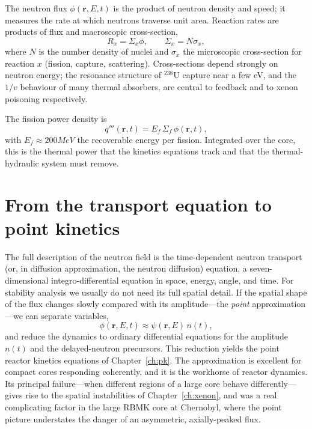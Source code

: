 The neutron flux $\phi(\mathbf r,E,t)$ is the product of neutron density and
speed; it measures the rate at which neutrons traverse unit area. Reaction rates
are products of flux and macroscopic cross-section,
\begin{equation}
R_x = \Sigma_x \phi, \qquad \Sigma_x = N\sigma_x,
\end{equation}
where $N$ is the number density of nuclei and $\sigma_x$ the microscopic
cross-section for reaction $x$ (fission, capture, scattering). Cross-sections
depend strongly on neutron energy; the resonance structure of $^{238}$U capture
near a few eV, and the $1/v$ behaviour of many thermal absorbers, are central to
feedback and to xenon poisoning respectively.

The fission power density is
\begin{equation}
q'''(\mathbf r,t) = E_f\, \Sigma_f\, \phi(\mathbf r,t),
\end{equation}
with $E_f\approx 200\unit{MeV}$ the recoverable energy per fission. Integrated
over the core, this is the thermal power that the kinetics equations track and
that the thermal-hydraulic system must remove.

\section{From the transport equation to point kinetics}

The full description of the neutron field is the time-dependent neutron transport
(or, in diffusion approximation, the neutron diffusion) equation, a
seven-dimensional integro-differential equation in space, energy, angle, and
time. For stability analysis we usually do not need its full spatial detail.
If the spatial shape of the flux changes slowly compared with its amplitude---the
\emph{point} approximation---we can separate variables,
\begin{equation}
\phi(\mathbf r,E,t)\approx \psi(\mathbf r,E)\, n(t),
\end{equation}
and reduce the dynamics to ordinary differential equations for the amplitude
$n(t)$ and the delayed-neutron precursors. This reduction yields the point
reactor kinetics equations of Chapter~\ref{ch:pk}. The approximation is excellent
for compact cores responding coherently, and it is the workhorse of reactor
dynamics. Its principal failure---when different regions of a large core behave
differently---gives rise to the spatial instabilities of
Chapter~\ref{ch:xenon}, and was a real complicating factor in the large RBMK core
at Chernobyl, where the point picture understates the danger of an asymmetric,
axially-peaked flux.



